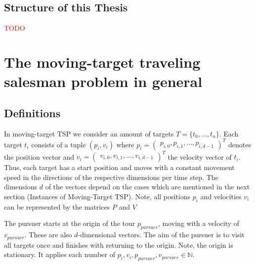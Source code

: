 \documentclass[english,version-2019-07]{uzl-thesis}
\begin{document}
\section{Structure of this Thesis}


%

\textcolor{red}{TODO}




%

\chapter{The moving-target traveling salesman problem in general}
\section{Definitions}
In moving-target TSP we consider an amount of targets $T=\{t_0,...,t_n\}$. Each target $t_i $ consists of a tuple $(p_i, v_i)$ where $p_i = \begin{pmatrix} p_{i,0}, p_{i,1}, ... , p_{i,d-1} \end{pmatrix}^T$ denotes the position vector and $v_i = \begin{pmatrix} v_{i,0}, v_{i,1}, ... , v_{i,d-1} \end{pmatrix}^T$ the velocity vector of $t_i$. Thus, each target has a start position and moves with a constant movement speed in the directions of the respective dimensions per time step. The dimensions $d$ of the vectors depend on the cases which are mentioned in the next section (Instances of Moving-Target TSP). Note, all positions $p_i$ and velocities $v_i$ can be represented by the matrices $P$ and $V$

The pursuer starts at the origin of the tour $p_{pursuer}$, moving with a velocity of $v_{pursuer}$. These are also $d$-dimensional vectors. The aim of the pursuer is to visit all targets once and finishes with returning to the origin. Note, the origin is stationary. It applies each number of $p_i, v_i, p_{pursuer}, v_{pursuer} \in \mathbb{N}$.
\end{document}
